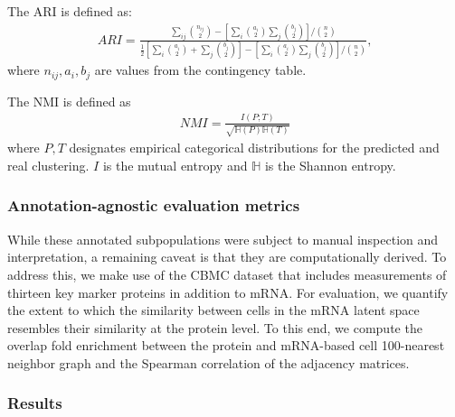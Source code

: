 The ARI is defined as:
\begin{align}
    ARI = \frac{\sum_{ij} \binom{n_{ij}}{2} - [\sum_i \binom{a_i}{2} \sum_j \binom{b_j}{2}] / \binom{n}{2} }{ \frac{1}{2} [\sum_i \binom{a_i}{2} + \sum_j \binom{b_j}{2}] - [\sum_i \binom{a_i}{2} \sum_j \binom{b_j}{2}] / \binom{n}{2}},
\end{align}
where $n_{ij}, a_i, b_j$ are values from the contingency table. 

The NMI is defined as 
\begin{align}
NMI = \frac{I(P;T)}{\sqrt{\mathbb{H}(P)\mathbb{H}(T)}}
\end{align}
where $P, T$ designates empirical categorical distributions for the predicted and real clustering. $I$ is the mutual entropy and $\mathbb{H}$ is the Shannon entropy.

\subsubsection{Annotation-agnostic evaluation metrics}
While these annotated subpopulations were subject to manual inspection and interpretation, a remaining caveat is that they are computationally derived. To address this, we make use of the CBMC dataset that includes measurements of thirteen key marker proteins in addition to mRNA. For evaluation, we quantify the extent to which the similarity between cells in the mRNA latent space resembles their similarity at the protein level. To this end, we compute the overlap fold enrichment between the protein and mRNA-based cell 100-nearest neighbor graph and the Spearman correlation of the adjacency matrices.

\subsubsection{Results}

